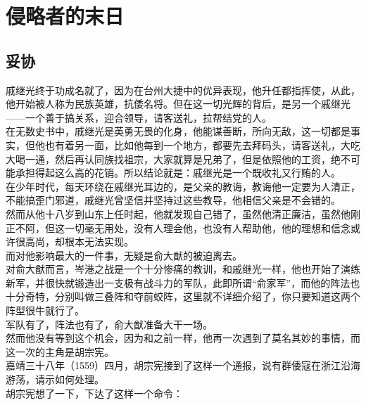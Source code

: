 \section{侵略者的末日}
\ifnum{}
	\begin{multicols}{\theparacolNo}
\fi
\subsection{妥协}
戚继光终于功成名就了，因为在台州大捷中的优异表现，他升任都指挥使，从此，他开始被人称为民族英雄，抗倭名将。但在这一切光辉的背后，是另一个戚继光——一个善于搞关系，迎合领导，请客送礼，拉帮结党的人。\\

在无数史书中，戚继光是英勇无畏的化身，他能谋善断，所向无敌，这一切都是事实，但他也有着另一面，比如他每到一个地方，都要先去拜码头，请客送礼，大吃大喝一通，然后再认同族找祖宗，大家就算是兄弟了，但是依照他的工资，绝不可能承担得起这么高的花销。所以结论就是：戚继光是一个既收礼又行贿的人。\\

在少年时代，每天环绕在戚继光耳边的，是父亲的教诲，教诲他一定要为人清正，不能搞歪门邪道，戚继光曾坚信并坚持过这些教导，他相信父亲是不会错的。\\

然而从他十八岁到山东上任时起，他就发现自己错了，虽然他清正廉洁，虽然他刚正不阿，但这一切毫无用处，没有人理会他，也没有人帮助他，他的理想和信念或许很高尚，却根本无法实现。\\

而对他影响最大的一件事，无疑是俞大猷的被迫离去。\\

对俞大猷而言，岑港之战是一个十分惨痛的教训，和戚继光一样，他也开始了演练新军，并很快就锻造出一支极有战斗力的军队，此即所谓“俞家军”，而他的阵法也十分奇特，分别叫做三叠阵和夺前蛟阵，这里就不详细介绍了，你只要知道这两个阵型很牛就行了。\\

军队有了，阵法也有了，俞大猷准备大干一场。\\

然而他没有等到这个机会，因为和之前一样，他再一次遇到了莫名其妙的事情，而这一次的主角是胡宗宪。\\

嘉靖三十八年（1559）四月，胡宗宪接到了这样一个通报，说有群倭寇在浙江沿海游荡，请示如何处理。\\

胡宗宪想了一下，下达了这样一个命令：\\


\end{multicols}
